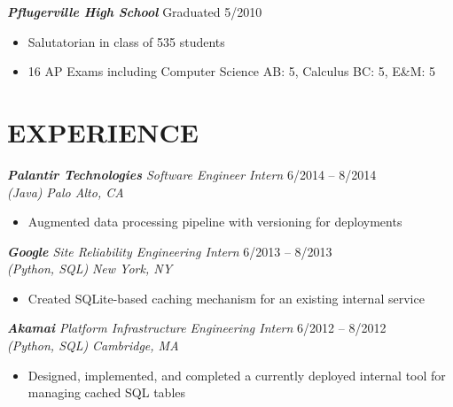 \documentclass[margin]{res}
\begin{document}
\begin{resume}
                    {\sl \bf Pflugerville High School} \hfill Graduated 5/2010
                    \begin{itemize} \itemsep -2pt %
                         \item Salutatorian in class of 535 students
                         \item 16 AP Exams including Computer Science AB: 5, 
                               Calculus BC: 5, E\&M: 5
                    \end{itemize}

\section{EXPERIENCE} 
                    {\sl{\bf Palantir Technologies} Software Engineer Intern} 
                    \hfill 6/2014 -- 8/2014 \\
                    {\sl (Java)}
                    \hfill{\sl  Palo Alto, CA}
                    \begin{itemize} \itemsep -2pt %
                        \setlength{\topsep}{0pt}
                         \item Augmented data processing pipeline with
                           versioning for deployments
                    \end{itemize} 


                    {\sl{\bf Google} Site Reliability Engineering Intern} 
                    \hfill 6/2013 -- 8/2013 \\
                    {\sl (Python, SQL)}
                    \hfill {\sl  New York, NY}
                    \begin{itemize} \itemsep -2pt %
                        \setlength{\topsep}{0pt}
                         \item Created SQLite-based
                           caching mechanism for an existing internal service
                    \end{itemize} 

                    {\sl {\bf Akamai} 
                      Platform Infrastructure Engineering Intern} 
                    \hfill 6/2012 -- 8/2012 \\
                    {\sl (Python, SQL)}
                    \hfill {\sl Cambridge, MA}
                    \begin{itemize} \itemsep -2pt %
                         \item Designed, implemented, and completed a 
                           currently deployed internal tool for managing cached
                           SQL tables
                    \end{itemize}


\end{resume}
\end{document}
